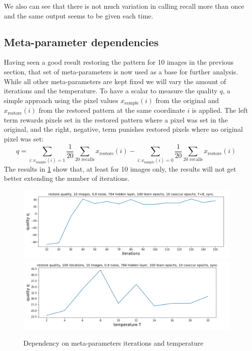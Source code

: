 \documentclass[12pt,twoside]{article}
\theoremstyle{plain}
\theoremstyle{definition}
\theoremstyle{remark}
\begin{document}
We also can see that there is not much variation in calling recall more than once and the same output seems to be given each time. 


\subsection{Meta-parameter dependencies}

Having seen a good result restoring the pattern for 10 images in the previous section, that set of meta-parameters is now used as a base for further analysis. While all other meta-parameters are kept fixed we will vary the amount of iterations and the temperature. To have a scalar to measure the quality $q$, a simple approach using the pixel values $x_\text{sample}(i)$ from the original and $x_\text{restore}(i)$ from the restored pattern at the same coordinate $i$ is applied. The left term rewards pixels set in the restored pattern where a pixel was set in the original, and the right, negative, term punishes restored pixels where no original pixel was set:
$$q = \sum_{i : x_\text{sample}(i) = 1} \frac1{20}\sum_{\text{20 recalls}}x_\text{restore}(i) - \sum_{i : x_\text{sample}(i) = 0} \frac1{20}\sum_{\text{20 recalls}}x_\text{restore}(i)$$
The results in \cref{fig:test_vary_epoch_t} show that, at least for 10 images only, the results will not get better extending the number of iterations.

\begin{figure}[b!]
	\begin{center}
	\includegraphics[trim={0cm 0cm 0cm 0cm},clip,width=\textwidth]{src/test_restore_quality_10_images_vary_epochs}
	\includegraphics[trim={0.1cm 0cm 1.2cm 0cm},clip,width=\textwidth]{src/test_restore_quality_10_images_vary_temperature}
	\end{center}
	\caption{Dependency on meta-parameters iterations and temperature}\label{fig:test_vary_epoch_t}
\end{figure}
\end{document}
